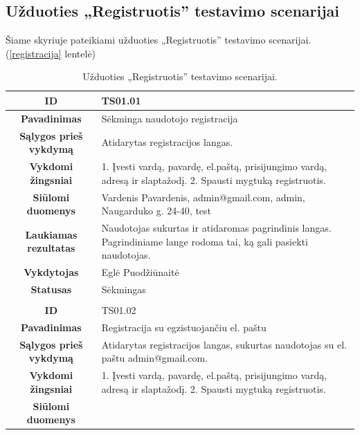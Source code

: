 \documentclass{VUMIFPSkursinis}
\begin{document}
	\subsection{Užduoties „Registruotis” testavimo scenarijai}
	Šiame skyriuje pateikiami užduoties „Registruotis” testavimo scenarijai. (\ref{registracija} lentelė)
	\begin{table}[H]
		\caption{Užduoties „Registruotis” testavimo scenarijai.}
		\begin{tabular}{|p{6cm}|p{11cm}|}
			\hline
			\multicolumn{1}{|c|}{{\bfseries ID}}&
			{TS01.01}\\
			\hline
			\multicolumn{1}{|c|}{{\bfseries Pavadinimas}}&
			{Sėkminga naudotojo registracija}\\
			\hline
			\multicolumn{1}{|c|}{{\bfseries Sąlygos prieš vykdymą}}&
			{Atidarytas registracijos langas.}\\
			\hline
			\multicolumn{1}{|c|}{{\bfseries Vykdomi žingsniai}}&
			{1. Įvesti vardą, pavardę, el.paštą, prisijungimo vardą, adresą ir slaptažodį.
			 2. Spausti mygtuką registruotis.}\\
			\hline
			\multicolumn{1}{|c|}{{\bfseries Siūlomi duomenys}}&
			{Vardenis Pavardenis, admin@gmail.com, admin, Naugarduko g. 24-40, test}\\
			\hline
			\multicolumn{1}{|c|}{{\bfseries Laukiamas rezultatas}}&
			{Naudotojas sukurtas ir atidaromas pagrindinis langas. Pagrindiniame lange rodoma tai, ką gali pasiekti naudotojas.}\\
			\hline
			\multicolumn{1}{|c|}{{\bfseries Vykdytojas}}&
			{Eglė Puodžiūnaitė}\\
			\hline
			\multicolumn{1}{|c|}{{\bfseries Statusas}}&
			{Sėkmingas}\\
			\hline
			\rowcolor{lightgray}
			\multicolumn{2}{|c|}{}\\
			\hline
			\multicolumn{1}{|c|}{{\bfseries ID}}&
			{TS01.02}\\
			\hline
			\multicolumn{1}{|c|}{{\bfseries Pavadinimas}}&
			{Registracija su egzistuojančiu el. paštu}\\
			\hline
			\multicolumn{1}{|c|}{{\bfseries Sąlygos prieš vykdymą}}&
			{Atidarytas registracijos langas, sukurtas naudotojas su el. paštu admin@gmail.com.}\\
			\hline
			\multicolumn{1}{|c|}{{\bfseries Vykdomi žingsniai}}&
			{1. Įvesti vardą, pavardę, el.paštą, prisijungimo vardą, adresą ir slaptažodį.
			 2. Spausti mygtuką registruotis.}\\
			\hline
			\multicolumn{1}{|c|}{{\bfseries Siūlomi duomenys}}&

\end{tabular}
\end{table}
\end{document}
